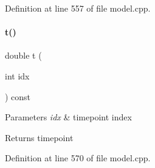 Definition at line 557 of file model.\+cpp.

\mbox{\label{classamici_1_1_model_a711281d57e9710226face29151cc4641}} 
\paragraph{\texorpdfstring{t()}{t()}}
{\footnotesize\ttfamily double t (\begin{DoxyParamCaption}\item[{int}]{idx }\end{DoxyParamCaption}) const}


\begin{DoxyParams}{Parameters}
{\em idx} & timepoint index \\
\hline
\end{DoxyParams}
\begin{DoxyReturn}{Returns}
timepoint 
\end{DoxyReturn}


Definition at line 570 of file model.\+cpp.

